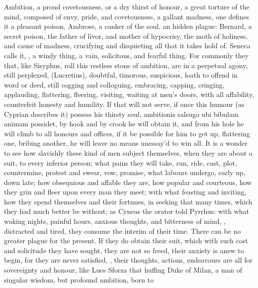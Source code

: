 {Ambition, a proud covetousness, or a dry thirst of honour, a great
torture of the mind, composed of envy, pride, and covetousness, a
gallant madness, one defines it a pleasant poison, Ambrose, a
canker of the soul, an hidden plague: Bernard, a secret poison,
the father of livor, and mother of hypocrisy, the moth of holiness, and
cause of madness, crucifying and disquieting all that it takes hold of.
Seneca calls it, , a windy
thing, a vain, solicitous, and fearful thing. For commonly they that,
like Sisyphus, roll this restless stone of ambition, are in a perpetual
agony, still perplexed, 
(Lucretius), doubtful, timorous, suspicious, loath to offend in word or
deed, still cogging and colloguing, embracing, capping, cringing,
applauding, flattering, fleering, visiting, waiting at men's doors,
with all affability, counterfeit honesty and humility. If that
will not serve, if once this humour (as Cyprian describes it)
possess his thirsty soul, ambitionis salsugo ubi bibulam animam
possidet, by hook and by crook he will obtain it, and from his hole he
will climb to all honours and offices, if it be possible for him to get
up, flattering one, bribing another, he will leave no means unessay'd
to win all. It is a wonder to see how slavishly these kind of men
subject themselves, when they are about a suit, to every inferior
person; what pains they will take, run, ride, cast, plot, countermine,
protest and swear, vow, promise, what labours undergo, early up, down
late; how obsequious and affable they are, how popular and courteous,
how they grin and fleer upon every man they meet; with what feasting
and inviting, how they spend themselves and their fortunes, in seeking
that many times, which they had much better be without; as Cyneas
the orator told Pyrrhus: with what waking nights, painful hours,
anxious thoughts, and bitterness of mind, ,
distracted and tired, they consume the interim of their time. There can
be no greater plague for the present. If they do obtain their suit,
which with such cost and solicitude they have sought, they are not so
freed, their anxiety is anew to begin, for they are never satisfied,
, their thoughts, actions, endeavours
are all for sovereignty and honour, like Lues Sforza that huffing
Duke of Milan, a man of singular wisdom, but profound ambition, born to
}
